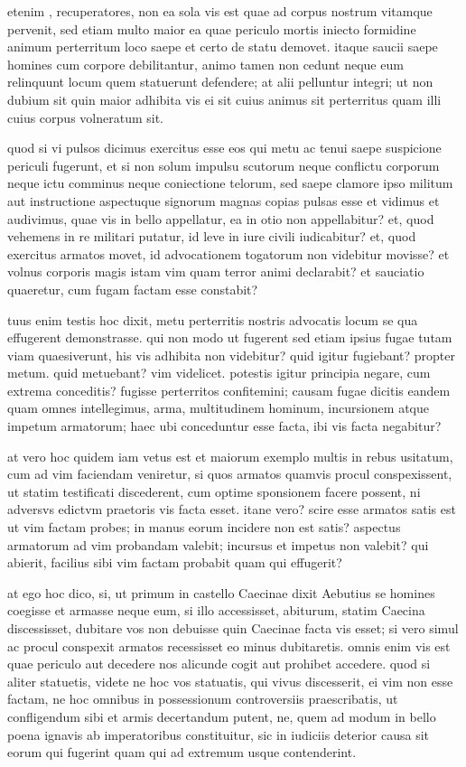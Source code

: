  etenim , recuperatores, non ea sola vis est quae ad corpus nostrum vitamque pervenit, sed etiam multo maior ea quae periculo mortis iniecto formidine animum perterritum loco saepe et certo de statu demovet. itaque saucii saepe homines cum corpore debilitantur, animo tamen non cedunt neque eum relinquunt locum quem statuerunt defendere; at alii pelluntur integri; ut non dubium sit quin maior adhibita vis ei sit cuius animus sit perterritus quam illi cuius corpus volneratum sit.

 quod si vi pulsos dicimus exercitus esse eos qui metu ac tenui saepe suspicione periculi fugerunt, et si non solum impulsu scutorum neque conflictu corporum neque ictu comminus neque coniectione telorum, sed saepe clamore ipso militum aut instructione aspectuque signorum magnas copias pulsas esse et vidimus et audivimus, quae vis in bello appellatur, ea in otio non appellabitur? et, quod vehemens in re militari putatur, id leve in iure civili iudicabitur? et, quod exercitus armatos movet, id advocationem togatorum non videbitur movisse? et volnus corporis magis istam vim quam terror animi declarabit? et sauciatio quaeretur, cum fugam factam esse constabit?

 tuus enim testis hoc dixit, metu perterritis nostris advocatis locum se qua effugerent demonstrasse. qui non modo ut fugerent sed etiam ipsius fugae tutam viam quaesiverunt, his vis adhibita non videbitur? quid igitur fugiebant? propter metum. quid metuebant? vim videlicet. potestis igitur principia negare, cum extrema conceditis? fugisse perterritos confitemini; causam fugae dicitis eandem quam omnes intellegimus, arma, multitudinem hominum, incursionem atque impetum armatorum; haec ubi conceduntur esse facta, ibi vis facta negabitur?

 at vero hoc quidem iam vetus est et maiorum exemplo multis in rebus usitatum, cum ad vim faciendam veniretur, si quos armatos quamvis procul conspexissent, ut statim testificati discederent, cum optime sponsionem facere possent, ni adversvs edictvm praetoris vis facta esset. itane vero? scire esse armatos satis est ut vim factam probes; in manus eorum incidere non est satis? aspectus armatorum ad vim probandam valebit; incursus et impetus non valebit? qui abierit, facilius sibi vim factam probabit quam qui effugerit?

 at ego hoc dico, si, ut primum in castello Caecinae dixit Aebutius se homines coegisse et armasse neque eum, si illo accessisset, abiturum, statim Caecina discessisset, dubitare vos non debuisse quin Caecinae facta vis esset; si vero simul ac procul conspexit armatos recessisset eo minus dubitaretis. omnis enim vis est quae periculo aut decedere nos alicunde cogit aut prohibet accedere. quod si aliter statuetis, videte ne hoc vos statuatis, qui vivus discesserit, ei vim non esse factam, ne hoc omnibus in possessionum controversiis praescribatis, ut confligendum sibi et armis decertandum putent, ne, quem ad modum in bello poena ignavis ab imperatoribus constituitur, sic in iudiciis deterior causa sit eorum qui fugerint quam qui ad extremum usque contenderint.

